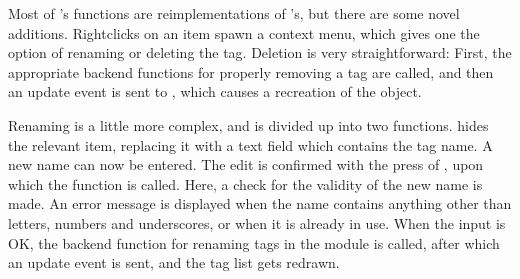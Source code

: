 Most of 's functions are reimplementations of
's, but there are some novel additions. Rightclicks on
an item spawn a context menu, which gives one the option of renaming or
deleting the tag. Deletion is very straightforward: First, the appropriate
backend functions for properly removing a tag are called, and then an update
event is sent to , which causes a recreation of the
 object.

Renaming is a little more complex, and is divided up into two functions.
 hides the relevant item, replacing it with a text field
which contains the tag name. A new name can now be entered. The edit is
confirmed with the press of , upon which the function
 is called. Here, a check for the validity of the new name is
made. An error message is displayed when the name contains anything other than
letters, numbers and underscores, or when it is already in use. When the input
is OK, the backend function for renaming tags in the  module is
called, after which an update event is sent, and the tag list gets redrawn.
